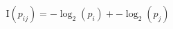 \documentclass[preview]{standalone}
\begin{document}
\begin{align*}
\mathrm{I}(p_{ij}) = -\log_2(p_i) + -\log_2(p_j)
\end{align*}
\end{document}
